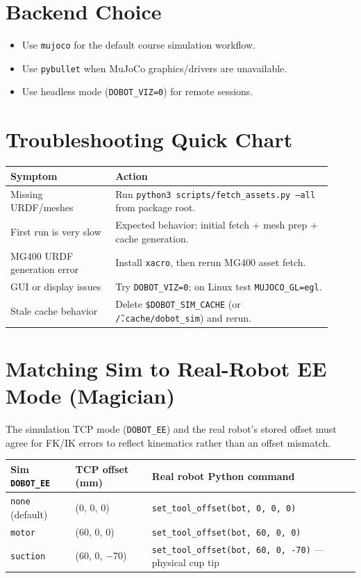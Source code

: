 \documentclass[11pt,a4paper]{article}
\begin{document}
\section{Backend Choice}
\begin{itemize}
  \item Use \texttt{mujoco} for the default course simulation workflow.
  \item Use \texttt{pybullet} when MuJoCo graphics/drivers are unavailable.
  \item Use headless mode (\texttt{DOBOT\_VIZ=0}) for remote sessions.
\end{itemize}

\section{Troubleshooting Quick Chart}
\begin{longtable}{|p{0.3\linewidth}|p{0.62\linewidth}|}
\hline
\textbf{Symptom} & \textbf{Action} \\
\hline
Missing URDF/meshes &
Run \texttt{python3 scripts/fetch\_assets.py --all} from package root. \\
\hline
First run is very slow &
Expected behavior: initial fetch + mesh prep + cache generation. \\
\hline
MG400 URDF generation error &
Install \texttt{xacro}, then rerun MG400 asset fetch. \\
\hline
GUI or display issues &
Try \texttt{DOBOT\_VIZ=0}; on Linux test \texttt{MUJOCO\_GL=egl}. \\
\hline
Stale cache behavior &
Delete \texttt{\$DOBOT\_SIM\_CACHE} (or \texttt{\~/.cache/dobot\_sim}) and rerun. \\
\hline
\end{longtable}

\section{Matching Sim to Real-Robot EE Mode (Magician)}

The simulation TCP mode (\texttt{DOBOT\_EE}) and the real robot's stored
offset must agree for FK/IK errors to reflect kinematics rather than an
offset mismatch.

\begin{center}
\begin{tabular}{|l|l|l|}
\hline
\textbf{Sim \texttt{DOBOT\_EE}} & \textbf{TCP offset (mm)} & \textbf{Real robot Python command} \\
\hline
\texttt{none} (default) & (0, 0, 0) & \texttt{set\_tool\_offset(bot, 0, 0, 0)} \\
\hline
\texttt{motor} & (60, 0, 0) & \texttt{set\_tool\_offset(bot, 60, 0, 0)} \\
\hline
\texttt{suction} & (60, 0, $-$70) & \texttt{set\_tool\_offset(bot, 60, 0, -70)} --- physical cup tip \\
\hline
\end{tabular}
\end{center}
\end{document}
